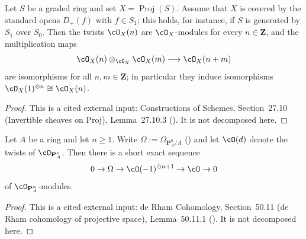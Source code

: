 \begin{lemma}
\label{lem:pc-proj-twists-invertible}
Let $S$ be a graded ring and set $X=\operatorname{Proj}(S)$.  Assume that
$X$ is covered by the standard opens $D_+(f)$ with $f\in S_1$; this holds,
for instance, if $S$ is generated by $S_1$ over $S_0$.  Then the twists
$\cO_X(n)$ are 
$\cO_X$-modules for every $n\in\mathbf Z$, and the multiplication maps
\[
\cO_X(n)\otimes_{\cO_X}\cO_X(m)\longrightarrow\cO_X(n+m)
\]
are isomorphisms for all $n,m\in\mathbf Z$; in particular they induce
isomorphisms $\cO_X(1)^{\otimes n}\cong\cO_X(n)$.
\end{lemma}
\begin{proof}
This is a cited external input: Constructions of Schemes, Section~27.10
(Invertible sheaves on Proj), Lemma~27.10.3 ().  It is
not decomposed here.
\end{proof}

\begin{lemma}
\label{lem:pc-euler-sequence}
Let $A$ be a ring and let $n\ge1$.  Write $\Omega:=\Omega_{\mathbf
P^n_A/A}$ () and let $\cO(d)$ denote the
twists of $\cO_{\mathbf P^n_A}$.  Then there is a short exact sequence
\[
0\to\Omega\to\cO(-1)^{\oplus n+1}\to\cO\to0
\]
of $\cO_{\mathbf P^n_A}$-modules.
\end{lemma}
\begin{proof}
This is a cited external input: de Rham Cohomology, Section~50.11 (de Rham
cohomology of projective space), Lemma~50.11.1 ().  It
is not decomposed here.
\end{proof}

